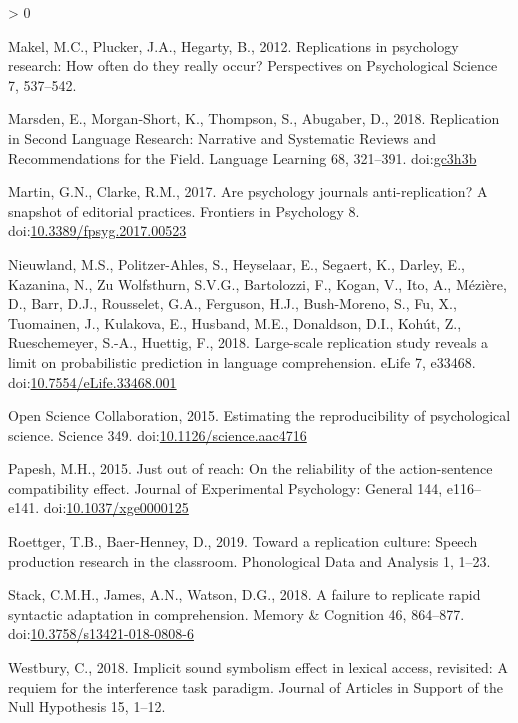 \documentclass[]{elsarticle} %
\newlength{\cslhangindent}
\newenvironment{CSLReferences}[2] %
 {%
  \setlength{\parindent}{0pt}
  \ifodd #1 \everypar{\setlength{\hangindent}{\cslhangindent}}\ignorespaces\fi
  \ifnum #2 > 0
  \setlength{\parskip}{#2\baselineskip}
  \fi
 }%
 {}
\begin{document}
\begin{CSLReferences}{1}{0}
\leavevmode\hypertarget{ref-makel_replications_2012}{}%
Makel, M.C., Plucker, J.A., Hegarty, B., 2012. Replications in
psychology research: {How} often do they really occur? Perspectives on
Psychological Science 7, 537--542.

\leavevmode\hypertarget{ref-marsden_replication_2018}{}%
Marsden, E., Morgan‐Short, K., Thompson, S., Abugaber, D., 2018.
Replication in {Second} {Language} {Research}: {Narrative} and
{Systematic} {Reviews} and {Recommendations} for the {Field}. Language
Learning 68, 321--391. doi:\href{https://doi.org/gc3h3b}{gc3h3b}

\leavevmode\hypertarget{ref-martinclarke_policies_2017}{}%
Martin, G.N., Clarke, R.M., 2017. Are psychology journals
anti-replication? A snapshot of editorial practices. Frontiers in
Psychology 8.
doi:\href{https://doi.org/10.3389/fpsyg.2017.00523}{10.3389/fpsyg.2017.00523}

\leavevmode\hypertarget{ref-nieuwland_large-scale_2018}{}%
Nieuwland, M.S., Politzer-Ahles, S., Heyselaar, E., Segaert, K., Darley,
E., Kazanina, N., Zu Wolfsthurn, S.V.G., Bartolozzi, F., Kogan, V., Ito,
A., Mézière, D., Barr, D.J., Rousselet, G.A., Ferguson, H.J.,
Bush-Moreno, S., Fu, X., Tuomainen, J., Kulakova, E., Husband, M.E.,
Donaldson, D.I., Kohút, Z., Rueschemeyer, S.-A., Huettig, F., 2018.
Large-scale replication study reveals a limit on probabilistic
prediction in language comprehension. eLife 7, e33468.
doi:\href{https://doi.org/10.7554/eLife.33468.001}{10.7554/eLife.33468.001}

\leavevmode\hypertarget{ref-open_science_collaboration_estimating_2015}{}%
Open Science Collaboration, 2015. Estimating the reproducibility of
psychological science. Science 349.
doi:\href{https://doi.org/10.1126/science.aac4716}{10.1126/science.aac4716}

\leavevmode\hypertarget{ref-papesh_just_2015}{}%
Papesh, M.H., 2015. Just out of reach: {On} the reliability of the
action-sentence compatibility effect. Journal of Experimental
Psychology: General 144, e116--e141.
doi:\href{https://doi.org/10.1037/xge0000125}{10.1037/xge0000125}

\leavevmode\hypertarget{ref-roettger2019toward}{}%
Roettger, T.B., Baer-Henney, D., 2019. Toward a replication culture:
Speech production research in the classroom. Phonological Data and
Analysis 1, 1--23.

\leavevmode\hypertarget{ref-stack_failure_2018}{}%
Stack, C.M.H., James, A.N., Watson, D.G., 2018. A failure to replicate
rapid syntactic adaptation in comprehension. Memory \& Cognition 46,
864--877.
doi:\href{https://doi.org/10.3758/s13421-018-0808-6}{10.3758/s13421-018-0808-6}

\leavevmode\hypertarget{ref-westbury_implicit_2018}{}%
Westbury, C., 2018. Implicit sound symbolism effect in lexical access,
revisited: {A} requiem for the interference task paradigm. Journal of
Articles in Support of the Null Hypothesis 15, 1--12.

\end{CSLReferences}
\end{document}
